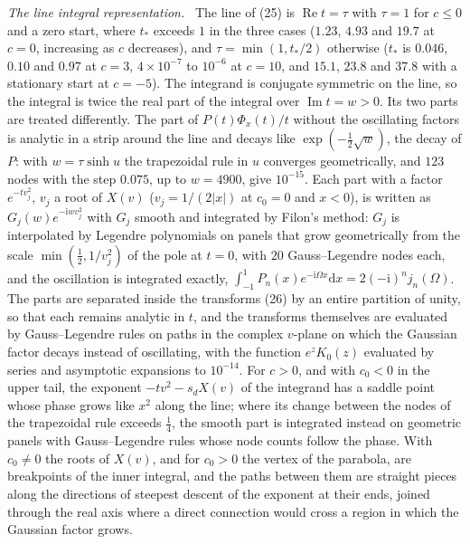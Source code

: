 \documentclass[ecta,nameyear,final,supplement]{econsocart}
\newcommand{\dr}[1]{{\mathrm d}#1}
\newcommand{\iu}{{\mathrm i}}
\newcommand{\Rea}{\operatorname{Re}}
\newcommand{\Ima}{\operatorname{Im}}
\theoremstyle{plain}
\theoremstyle{definition}
\newcommand{\runin}[1]{\par\medskip\noindent\textit{#1.}\ \ignorespaces}
\begin{document}
\runin{The line integral representation}  The line of (25) is $\Rea t=\tau$ with $\tau=1$ for $c\le0$ and a zero start, where $t_*$ exceeds $1$ in the three cases ($1.23$, $4.93$ and $19.7$ at $c=0$, increasing as $c$ decreases), and $\tau=\min(1,t_*/2)$ otherwise ($t_*$ is $0.046$, $0.10$ and $0.97$ at $c=3$, $4\times10^{-7}$ to $10^{-6}$ at $c=10$, and $15.1$, $23.8$ and $37.8$ with a stationary start at $c=-5$).  The integrand is conjugate symmetric on the line, so the integral is twice the real part of the integral over $\Ima t=w>0$.  Its two parts are treated differently.  The part of $P(t)\Phi_x(t)/t$ without the oscillating factors is analytic in a strip around the line and decays like $\exp(-\frac12\sqrt w)$, the decay of $P$: with $w=\tau\sinh u$ the trapezoidal rule in $u$ converges geometrically, and $123$ nodes with the step $0.075$, up to $w=4900$, give $10^{-15}$.  Each part with a factor $e^{-tv_j^2}$, $v_j$ a root of $X(v)$ ($v_j=1/(2|x|)$ at $c_0=0$ and $x<0$), is written as $G_j(w)e^{-\iu wv_j^2}$ with $G_j$ smooth and integrated by Filon's method: $G_j$ is interpolated by Legendre polynomials on panels that grow geometrically from the scale $\min(\frac12,1/v_j^2)$ of the pole at $t=0$, with $20$ Gauss--Legendre nodes each, and the oscillation is integrated exactly, $\int_{-1}^1P_n(x)e^{-\iu\Omega x}\dr{x}=2(-\iu)^nj_n(\Omega)$.  The parts are separated inside the transforms (26) by an entire partition of unity, so that each remains analytic in $t$, and the transforms themselves are evaluated by Gauss--Legendre rules on paths in the complex $v$-plane on which the Gaussian factor decays instead of oscillating, with the function $e^zK_0(z)$ evaluated by series and asymptotic expansions to $10^{-14}$.  For $c>0$, and with $c_0<0$ in the upper tail, the exponent $-tv^2-s_dX(v)$ of the integrand has a saddle point whose phase grows like $x^2$ along the line; where its change between the nodes of the trapezoidal rule exceeds $\frac14$, the smooth part is integrated instead on geometric panels with Gauss--Legendre rules whose node counts follow the phase.  With $c_0\ne0$ the roots of $X(v)$, and for $c_0>0$ the vertex of the parabola, are breakpoints of the inner integral, and the paths between them are straight pieces along the directions of steepest descent of the exponent at their ends, joined through the real axis where a direct connection would cross a region in which the Gaussian factor grows.
\end{document}
